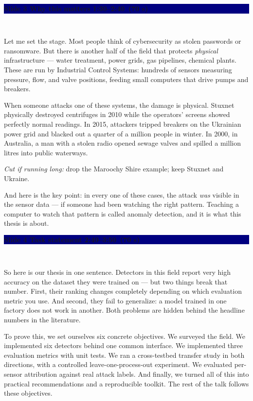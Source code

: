 \documentclass[11pt,a4paper]{article}
\newcommand{\slide}[5]{%
  \medskip
  \noindent\colorbox{navy}{\parbox{\dimexpr\textwidth-2\fboxsep}{%
    \color{white}\bfseries Slide #1 \;\textbar\; #2
    \hfill {\normalfont\color{lightbg}\small #4 \,(#5)}}}\\[2pt]
  \noindent{\color{teal}\small\textbf{Speaker: #3}}\par\vspace{2pt}%
}
\begin{document}
\slide{3}{Why this matters}{Danial}{1:30--2:40}{70 s}
Let me set the stage. Most people think of cybersecurity as stolen passwords or ransomware. But there is another half of the field that protects \textit{physical} infrastructure --- water treatment, power grids, gas pipelines, chemical plants. These are run by Industrial Control Systems: hundreds of sensors measuring pressure, flow, and valve positions, feeding small computers that drive pumps and breakers.

When someone attacks one of these systems, the damage is physical. Stuxnet physically destroyed centrifuges in 2010 while the operators' screens showed perfectly normal readings. In 2015, attackers tripped breakers on the Ukrainian power grid and blacked out a quarter of a million people in winter. In 2000, in Australia, a man with a stolen radio opened sewage valves and spilled a million litres into public waterways.

\begin{cut}\textit{Cut if running long:} drop the Maroochy Shire example; keep Stuxnet and Ukraine.\end{cut}
And here is the key point: in every one of these cases, the attack \textit{was} visible in the sensor data --- if someone had been watching the right pattern. Teaching a computer to watch that pattern is called anomaly detection, and it is what this thesis is about.

\slide{4}{Task statement}{Danial}{2:40--3:50}{70 s}
So here is our thesis in one sentence. Detectors in this field report very high accuracy on the dataset they were trained on --- but two things break that number. First, their ranking changes completely depending on which evaluation metric you use. And second, they fail to generalize: a model trained in one factory does not work in another. Both problems are hidden behind the headline numbers in the literature.

To prove this, we set ourselves six concrete objectives. We surveyed the field. We implemented six detectors behind one common interface. We implemented three evaluation metrics with unit tests. We ran a cross-testbed transfer study in both directions, with a controlled leave-one-process-out experiment. We evaluated per-sensor attribution against real attack labels. And finally, we turned all of this into practical recommendations and a reproducible toolkit. The rest of the talk follows these objectives.
\end{document}
